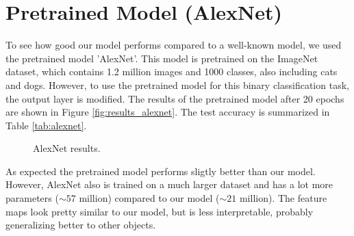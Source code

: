 \section{Pretrained Model (AlexNet)}
To see how good our model performs compared to a well-known model, we used the pretrained model 'AlexNet'.
This model is pretrained on the ImageNet dataset, which contains 1.2 million images and 1000 classes, also including cats and dogs.
However, to use the pretrained model for this binary classification task, the output layer is modified.
The results of the pretrained model after 20 epochs are shown in Figure \ref{fig:results_alexnet}. The test accuracy is summarized in Table \ref{tab:alexnet}.

\begin{figure}[H]
    \vspace*{-0.7cm}
    \centering
    \hspace{0.4cm}
    \caption{AlexNet results.}
    \label{fig:alexnet}
    \vspace*{-0.7cm}
\end{figure}


As expected the pretrained model performs sligtly better than our model. However, AlexNet also is trained on a much larger dataset and has a lot more parameters ($\sim 57$ million) compared to our model ($\sim 21$ million). The feature maps look pretty similar to our model, but is less interpretable, probably generalizing better to other objects.